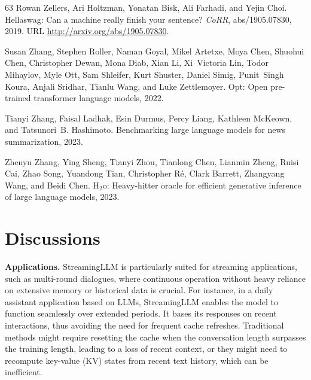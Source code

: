 \documentclass{article} \usepackage{iclr2024_conference,times}
\def\method{StreamingLLM\xspace}
\begin{document}
\begin{thebibliography}{63}
Rowan Zellers, Ari Holtzman, Yonatan Bisk, Ali Farhadi, and Yejin Choi.
\newblock Hellaswag: Can a machine really finish your sentence?
\newblock \emph{CoRR}, abs/1905.07830, 2019.
\newblock URL \url{http://arxiv.org/abs/1905.07830}.

Susan Zhang, Stephen Roller, Naman Goyal, Mikel Artetxe, Moya Chen, Shuohui
  Chen, Christopher Dewan, Mona Diab, Xian Li, Xi~Victoria Lin, Todor Mihaylov,
  Myle Ott, Sam Shleifer, Kurt Shuster, Daniel Simig, Punit~Singh Koura, Anjali
  Sridhar, Tianlu Wang, and Luke Zettlemoyer.
\newblock Opt: Open pre-trained transformer language models, 2022.

Tianyi Zhang, Faisal Ladhak, Esin Durmus, Percy Liang, Kathleen McKeown, and
  Tatsunori~B. Hashimoto.
\newblock Benchmarking large language models for news summarization,
  2023{}.

Zhenyu Zhang, Ying Sheng, Tianyi Zhou, Tianlong Chen, Lianmin Zheng, Ruisi Cai,
  Zhao Song, Yuandong Tian, Christopher Ré, Clark Barrett, Zhangyang Wang, and
  Beidi Chen.
\newblock H$_2$o: Heavy-hitter oracle for efficient generative inference of
  large language models, 2023{}.

\end{thebibliography}
 


\clearpage
\appendix
\section{Discussions}
\textbf{Applications.}
\method is particularly suited for streaming applications, such as multi-round dialogues, where continuous operation without heavy reliance on extensive memory or historical data is crucial. For instance, in a daily assistant application based on LLMs, StreamingLLM enables the model to function seamlessly over extended periods. It bases its responses on recent interactions, thus avoiding the need for frequent cache refreshes. Traditional methods might require resetting the cache when the conversation length surpasses the training length, leading to a loss of recent context, or they might need to recompute key-value (KV) states from recent text history, which can be inefficient.
\end{document}
